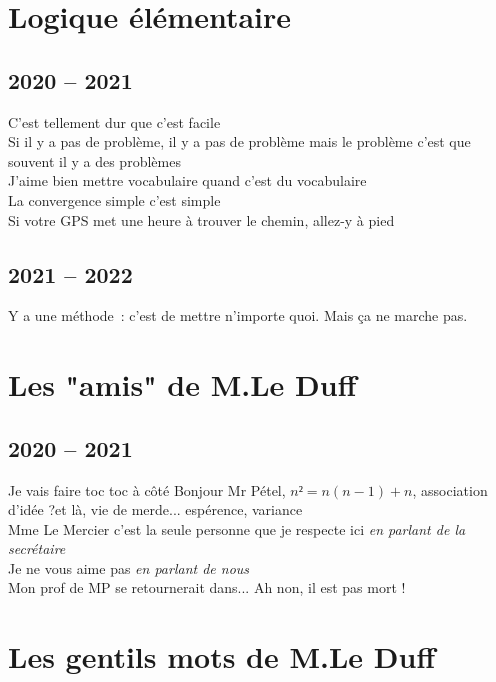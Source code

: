 \documentclass[french, a4paper, openany]{book}
\begin{document}
\chapter{Logique élémentaire}

\section{2020 -- 2021}

	\noindent \og C'est tellement dur que c'est facile \fg \\
	\og Si il y a pas de problème, il y a pas de problème mais le problème c'est que souvent il y a des problèmes \fg \\
	\og J'aime bien mettre vocabulaire quand c'est du vocabulaire \fg \\
	\og La convergence simple c'est simple \fg \\
	\og Si votre GPS met une heure à trouver le chemin, allez-y à pied \fg \\

\section{2021 -- 2022}

	\noindent \og Y a une méthode~: c'est de mettre n'importe quoi. Mais ça ne marche pas. \fg \\

\chapter{Les "amis" de M.Le Duff}

\section{2020 -- 2021}

	\noindent \og Je vais faire toc toc à côté \fg Bonjour Mr Pétel, $n² = n(n-1) + n$, association d'idée ?\og et là, vie de merde... \fg espérence, variance\og \fg \\
	\og Mme Le Mercier c'est la seule personne que je respecte ici \fg \emph{en parlant de la secrétaire} \\
	\og Je ne vous aime pas \fg \emph{en parlant de nous} \\
	\og Mon prof de MP se retournerait dans... Ah non, il est pas mort ! \fg \\

\chapter{Les gentils mots de M.Le Duff}
\end{document}
